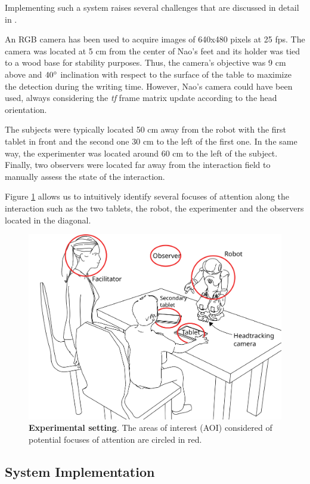\documentclass{sig-alternate}
\begin{document}
Implementing such a system raises several challenges that are discussed in
detail in \cite{Hood:2015}.

An RGB camera has been used to acquire images of 640x480 pixels at 25 fps. The
camera was located at 5 cm from the center of Nao's feet and its holder was tied
to a wood base for stability purposes. Thus, the camera's objective was 9 cm
above and $ 40\degree $ inclination with respect to the surface of the table to
maximize the detection during the writing time. However, Nao's camera could have
been used, always considering the \textit{tf} frame matrix update according to
the head orientation.

The subjects were typically located 50 cm away from the robot with the first
tablet in front and the second one 30 cm to the left of the first one. In the
same way, the experimenter was located around 60 cm to the left of the subject.
Finally, two observers were located far away from the interaction field to
manually assess the state of the interaction.

Figure \ref{drawSetup} allows us to intuitively identify several focuses of
attention along the interaction such as the two tablets, the robot, the
experimenter and the observers located in the diagonal.

\begin{figure}[h!]
    \centering
    \includegraphics[width=0.8\columnwidth]{experimental_setup}
    \caption{\small \textbf{Experimental setting}. The areas of interest (AOI)
    considered of potential focuses of attention are circled in red.}
    \label{drawSetup}
\end{figure}

\subsection{System Implementation}
\end{document}
